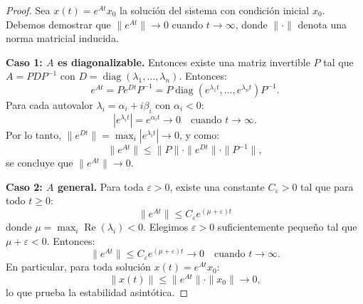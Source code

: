 \documentclass[11pt,a4paper]{article}
\theoremstyle{plain}
\theoremstyle{definition}
\begin{document}
\begin{proof}
Sea $x(t) = e^{At} x_0$ la solución del sistema con condición inicial $x_0$. Debemos demostrar que $\|e^{At}\| \to 0$ cuando $t \to \infty$, donde $\|\cdot\|$ denota una norma matricial inducida.

\textbf{Caso 1: $A$ es diagonalizable.} Entonces existe una matriz invertible $P$ tal que $A = P D P^{-1}$ con $D = \operatorname{diag}(\lambda_1, \ldots, \lambda_n)$. Entonces:
\[
e^{At} = P e^{Dt} P^{-1} = P \operatorname{diag}(e^{\lambda_1 t}, \ldots, e^{\lambda_n t}) P^{-1}.
\]
Para cada autovalor $\lambda_i = \alpha_i + i \beta_i$ con $\alpha_i < 0$:
\[
|e^{\lambda_i t}| = e^{\alpha_i t} \to 0 \quad \text{cuando } t \to \infty.
\]
Por lo tanto, $\|e^{Dt}\| = \max_i |e^{\lambda_i t}| \to 0$, y como:
\[
\|e^{At}\| \leq \|P\| \cdot \|e^{Dt}\| \cdot \|P^{-1}\|,
\]
se concluye que $\|e^{At}\| \to 0$.

\textbf{Caso 2: $A$ general.} Para toda $\varepsilon > 0$, existe una constante $C_\varepsilon > 0$ tal que para todo $t \geq 0$:
\[
\|e^{At}\| \leq C_\varepsilon e^{(\mu + \varepsilon) t}
\]
donde $\mu = \max_i \operatorname{Re}(\lambda_i) < 0$. Elegimos $\varepsilon > 0$ suficientemente pequeño tal que $\mu + \varepsilon < 0$. Entonces:
\[
\|e^{At}\| \leq C_\varepsilon e^{(\mu + \varepsilon) t} \to 0 \quad \text{cuando } t \to \infty.
\]
En particular, para toda solución $x(t) = e^{At} x_0$:
\[
\|x(t)\| \leq \|e^{At}\| \cdot \|x_0\| \to 0,
\]
lo que prueba la estabilidad asintótica.
\end{proof}
\end{document}
